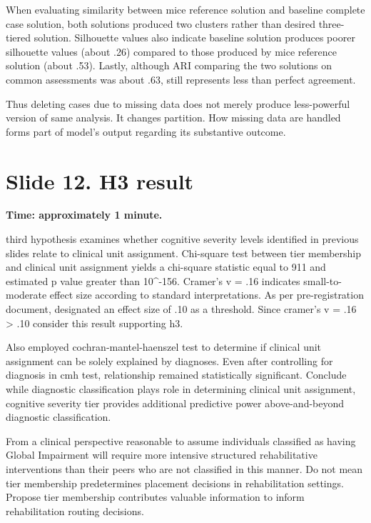 \documentclass[
  11pt,
]{article}
\begin{document}
When evaluating similarity between mice reference solution and baseline
complete case solution, both solutions produced two clusters rather than
desired three-tiered solution. Silhouette values also indicate baseline
solution produces poorer silhouette values (about .26) compared to those
produced by mice reference solution (about .53). Lastly, although ARI
comparing the two solutions on common assessments was about .63, still
represents less than perfect agreement.

Thus deleting cases due to missing data does not merely produce
less-powerful version of same analysis. It changes partition. How
missing data are handled forms part of model's output regarding its
substantive outcome.

\section{Slide 12. H3 result}\label{slide-12.-h3-result}

\textbf{Time: approximately 1 minute.}

third hypothesis examines whether cognitive severity levels identified
in previous slides relate to clinical unit assignment. Chi-square test
between tier membership and clinical unit assignment yields a chi-square
statistic equal to 911 and estimated p value greater than 10\^{}-156.
Cramer's v = .16 indicates small-to-moderate effect size according to
standard interpretations. As per pre-registration document, designated
an effect size of .10 as a threshold. Since cramer's v = .16
\textgreater{} .10 consider this result supporting h3.

Also employed cochran-mantel-haenszel test to determine if clinical unit
assignment can be solely explained by diagnoses. Even after controlling
for diagnosis in cmh test, relationship remained statistically
significant. Conclude while diagnostic classification plays role in
determining clinical unit assignment, cognitive severity tier provides
additional predictive power above-and-beyond diagnostic classification.

From a clinical perspective reasonable to assume individuals classified
as having Global Impairment will require more intensive structured
rehabilitative interventions than their peers who are not classified in
this manner. Do not mean tier membership predetermines placement
decisions in rehabilitation settings. Propose tier membership
contributes valuable information to inform rehabilitation routing
decisions.
\end{document}
